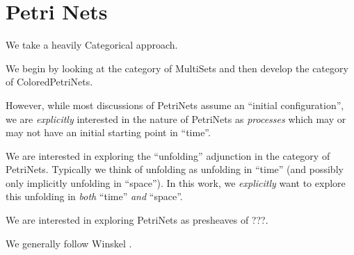 
\chapter*{Petri Nets}

We take a heavily Categorical approach.

We begin by looking at the category of MultiSets and then develop the category
of ColoredPetriNets.

However, while most discussions of PetriNets assume an ``initial
configuration'', we are \emph{explicitly} interested in the nature of PetriNets
as \emph{processes} which may or may not have an initial starting point in
``time''.

We are interested in exploring the ``unfolding'' adjunction in the category of
PetriNets. Typically we think of unfolding as unfolding in ``time'' (and
possibly only implicitly unfolding in ``space''). In this work, we
\emph{explicitly} want to explore this unfolding in \emph{both} ``time''
\emph{and} ``space''.

We are interested in exploring PetriNets as presheaves of ???.

We generally follow Winskel \cite{keylist}.
